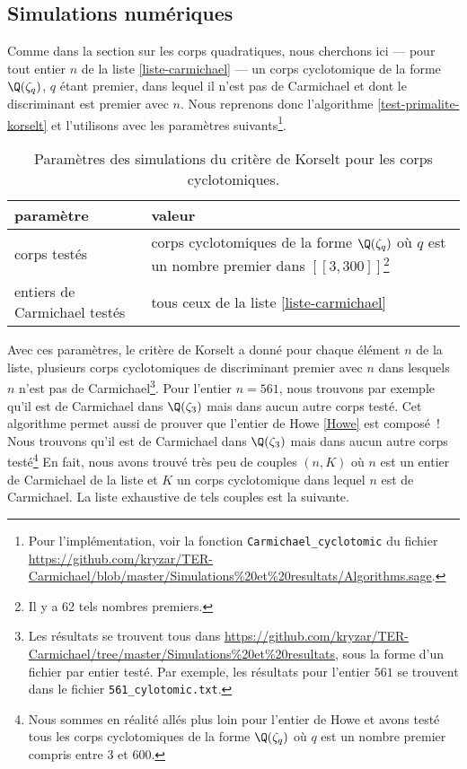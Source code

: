 \subsection{Simulations numériques}

Comme dans la section sur les corps quadratiques, nous cherchons ici — pour tout entier $n$ de la liste \ref{liste-carmichael} — un corps cyclotomique de la forme $\Q(\zeta_q)$, $q$ étant premier, dans lequel il n'est pas de Carmichael et dont le discriminant est premier avec $n$. Nous reprenons donc l'algorithme \ref{test-primalite-korselt} et l'utilisons avec les paramètres suivants\footnote{Pour l'implémentation, voir la fonction \texttt{Carmichael\_cyclotomic} du fichier \url{https://github.com/kryzar/TER-Carmichael/blob/master/Simulations\%20et\%20resultats/Algorithms.sage}.}.

\begin{table}[H]\label{param-korselt-cyclo}
	\begin{center}
		\begin{tabularx}{\textwidth}{|Y|Y|}
			\hline
			paramètre & valeur \\
			\hline
			\hline
			corps testés & corps cyclotomiques de la forme $\Q(\zeta_q)$ où $q$ est un nombre premier dans $[\![3, 300]\!]$\footnote{Il y a 62 tels nombres premiers.} \\\hline
			entiers de Carmichael testés & tous ceux de la liste \ref{liste-carmichael} \\\hline
		\end{tabularx}
		\caption{Paramètres des simulations du critère de Korselt pour les corps cyclotomiques.}
	\end{center}
\end{table}

Avec ces paramètres, le critère de Korselt a donné pour chaque élément $n$ de la liste, plusieurs corps cyclotomiques de discriminant premier avec $n$ dans lesquels $n$ n'est pas de Carmichael\footnote{Les résultats se trouvent tous dans \url{https://github.com/kryzar/TER-Carmichael/tree/master/Simulations\%20et\%20resultats}, sous la forme d'un fichier par entier testé. Par exemple, les résultats pour l'entier $561$ se trouvent dans le fichier \texttt{561\_cylotomic.txt}.}. Pour l'entier $n = 561$, nous trouvons par exemple qu'il est de Carmichael dans $\Q(\zeta_3)$ mais dans aucun autre corps testé. Cet algorithme permet aussi de prouver que l'entier de Howe \ref{Howe} est composé~! Nous trouvons qu'il est de Carmichael dans $\Q(\zeta_3)$ mais dans aucun autre corps testé\footnote{Nous sommes en réalité allés plus loin pour l'entier de Howe et avons testé tous les corps cyclotomiques de la forme $\Q(\zeta_q)$ où $q$ est un nombre premier compris entre $3$ et $600$.} En fait, nous avons trouvé très peu de couples $(n, K)$ où $n$ est un entier de Carmichael de la liste et $K$ un corps cyclotomique dans lequel $n$ est de Carmichael. La liste exhaustive de tels couples est la suivante.


